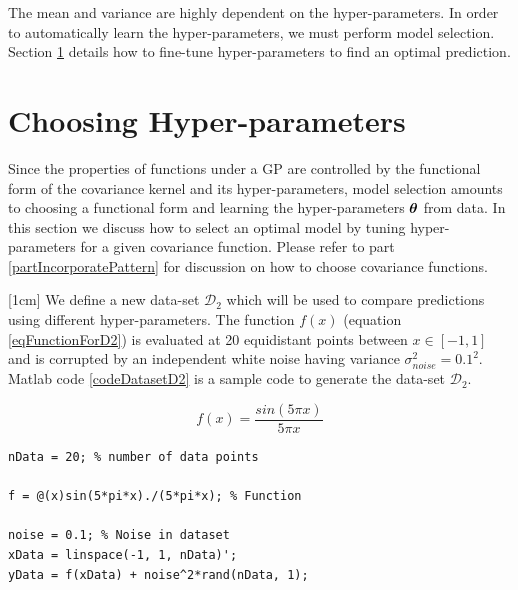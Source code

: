 The mean and variance are highly dependent on the hyper-parameters. In order to automatically learn the hyper-parameters, we must perform model selection. Section \ref{secHyperParameter} details how to fine-tune hyper-parameters to find an optimal prediction.

\section{Choosing Hyper-parameters}\label{secHyperParameter}
Since the properties of functions under a GP are controlled by the functional form of the covariance kernel and its hyper-parameters, model selection amounts to choosing a functional form and learning the hyper-parameters $\boldsymbol{\theta}$ from data. In this section we discuss how to select an optimal model by tuning hyper-parameters for a given covariance function. Please refer to part \ref{partIncorporatePattern} for discussion on how to choose covariance functions. 

[1cm]
We define a new data-set $\mathcal{D}_{2}$ which will be used to compare predictions using different hyper-parameters. The function $f(x)$ (equation \ref{eqFunctionForD2}) is evaluated at 20 equidistant points between $x \in [-1, 1]$ and is corrupted by an independent white noise having variance $\sigma_{noise}^2 = 0.1^2$. Matlab code \ref{codeDatasetD2} is a sample code to generate the data-set  $\mathcal{D}_{2}$. 

\begin{equation}\label{eqFunctionForD2}
f(x) = \frac{sin(5 \pi x)}{5 \pi x}
\end{equation}

\begin{mdframed}[hidealllines=true,backgroundcolor=lightgray!20]
\begin{lstlisting}[caption={Code for data-set D2}, 
                    captionpos=b, 
                    label={codeDatasetD2},
                    style=Matlab-editor,
                    basicstyle=\color{black}\ttfamily\small,
                    backgroundcolor = \color{MatlabCellColour}]
nData = 20; % number of data points

f = @(x)sin(5*pi*x)./(5*pi*x); % Function

noise = 0.1; % Noise in dataset
xData = linspace(-1, 1, nData)';
yData = f(xData) + noise^2*rand(nData, 1);

\end{lstlisting}
\end{mdframed}

